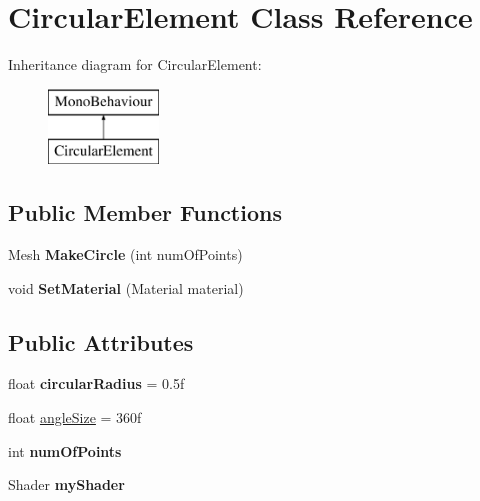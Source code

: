 \hypertarget{class_circular_element}{}\section{Circular\+Element Class Reference}
\label{class_circular_element}
Inheritance diagram for Circular\+Element\+:\begin{figure}[H]
\begin{center}
\leavevmode
\includegraphics[height=2.000000cm]{class_circular_element}
\end{center}
\end{figure}
\subsection*{Public Member Functions}
\begin{DoxyCompactItemize}
\item 
\mbox{\label{class_circular_element_ae7c9c04c0e02283602c34a7bf0a5c1b0}} 
Mesh {\bfseries Make\+Circle} (int num\+Of\+Points)
\item 
\mbox{\label{class_circular_element_a4eb5a7f5890b2ce9c26f2b83d8390320}} 
void {\bfseries Set\+Material} (Material material)
\end{DoxyCompactItemize}
\subsection*{Public Attributes}
\begin{DoxyCompactItemize}
\item 
\mbox{\label{class_circular_element_a4d50d6f56387cb2ab0e49997d04459a5}} 
float {\bfseries circular\+Radius} = 0.\+5f
\item 
float \hyperlink{class_circular_element_a9442a4ccbffb0581a724e1fb1cdea53f}{angle\+Size} = 360f
\item 
\mbox{\label{class_circular_element_a7a4d50b83e1c51cab0667d6c2bd7b713}} 
int {\bfseries num\+Of\+Points}
\item 
\mbox{\label{class_circular_element_ae823fbe8cf80972c9ccefb02b8f36cf6}} 
Shader {\bfseries my\+Shader}
\end{DoxyCompactItemize}


